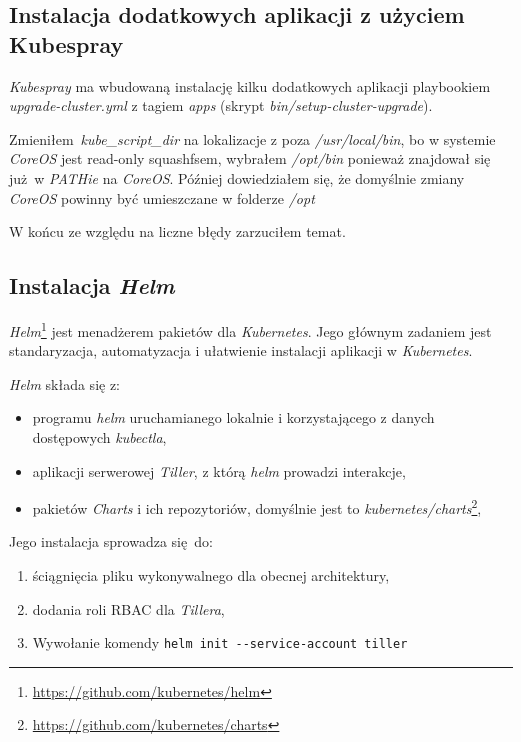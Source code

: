 \documentclass[a4paper,12pt,twoside,openany]{report}
\providecommand{\tightlist}{%
  \setlength{\itemsep}{0pt}\setlength{\parskip}{0pt}}
\DeclareRobustCommand{\href}[2]{#2\footnote{\url{#1}}}
\newcommand{\passthrough}[1]{#1}
\begin{document}
\hypertarget{instalacja-dodatkowych-aplikacji-z-uux17cyciem-kubespray}{%
\subsection{Instalacja dodatkowych aplikacji z użyciem
Kubespray}\label{instalacja-dodatkowych-aplikacji-z-uux17cyciem-kubespray}}

\emph{Kubespray} ma wbudowaną instalację kilku dodatkowych aplikacji
playbookiem \emph{upgrade-cluster.yml} z tagiem \emph{apps} (skrypt
\emph{bin/setup-cluster-upgrade}).

Zmieniłem~\emph{kube\_script\_dir} na lokalizacje z poza
\emph{/usr/local/bin}, bo w systemie \emph{CoreOS} jest read-only
squashfsem, wybrałem \emph{/opt/bin} ponieważ znajdował się już~w
\emph{PATHie} na \emph{CoreOS}. Później dowiedziałem się, że domyślnie
zmiany \emph{CoreOS} powinny być umieszczane w folderze \emph{/opt}

W końcu ze względu na liczne błędy zarzuciłem temat.

\hypertarget{instalacja-helm}{%
\subsection{\texorpdfstring{Instalacja
\emph{Helm}}{Instalacja Helm}}\label{instalacja-helm}}

\href{https://github.com/kubernetes/helm}{\emph{Helm}} jest menadżerem
pakietów dla \emph{Kubernetes}. Jego głównym zadaniem jest
standaryzacja, automatyzacja i ułatwienie instalacji aplikacji w
\emph{Kubernetes}.

\emph{Helm} składa się z:

\begin{itemize}
\tightlist
\item
  programu \emph{helm} uruchamianego lokalnie i korzystającego z danych
  dostępowych \emph{kubectla},
\item
  aplikacji serwerowej \emph{Tiller}, z którą \emph{helm} prowadzi
  interakcje,
\item
  pakietów \emph{Charts} i ich repozytoriów, domyślnie jest to
  \href{https://github.com/kubernetes/charts}{\emph{kubernetes/charts}},
\end{itemize}

Jego instalacja sprowadza się~do:

\begin{enumerate}
\def\labelenumi{\arabic{enumi}.}
\tightlist
\item
  ściągnięcia pliku wykonywalnego dla obecnej architektury,
\item
  dodania roli RBAC dla \emph{Tillera},
\item
  Wywołanie komendy
  \passthrough{\lstinline!helm init --service-account tiller!}
\end{enumerate}
\end{document}
